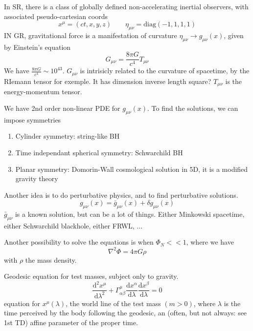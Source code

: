 \documentclass[a4paper]{book}
\theoremstyle{definition}
\theoremstyle{remark}
\begin{document}
In SR, there is a class of globally defined non-accelerating inertial observers, with associated pseudo-cartesian coords 
\begin{equation}
    x^\mu = (ct, x, y, z) \qquad \eta_{\mu\nu} = \text{diag}(-1, 1, 1, 1)
\end{equation}
IN GR, gravitational force is a manifestation of curvature $\eta_{\mu\nu} \rightarrow g_{\mu\nu}(x)$, given by Einstein's equation 
\begin{equation}
    G_{\mu\nu} = \frac{8\pi G}{c^4}T_{\mu\nu}
\end{equation}
We have $\frac{8\pi G}{c^4} \sim 10^{43}$. $G_{\mu\nu}$ is intrisicly related to the curvature of spacetime, by the RIemann tensor for exemple. It has dimension inverse length square? $T_{\mu\nu}$ is the energy-momentum tensor. \par \medskip 

We have 2nd order non-linear PDE for $g_{\mu\nu}(x)$. To find the solutions, we can impose symmetries 

\begin{enumerate}
    \item Cylinder symmetry: string-like BH
    \item Time independant spherical symmetry: Schwarchild BH 
    \item Planar symmetry: Domorin-Wall cosmological solution in 5D, it is a modified gravity theory
\end{enumerate}

Another idea is to do perturbative physics, and to find perturbative solutions. 
\begin{equation}
    g_{\mu\nu}(x) = \bar{g}_{\mu\nu}(x) + \delta g_{\mu\nu}(x)
\end{equation}
$\bar{g}_{\mu\nu}$ is a known solution, but can be a lot of things. Either Minkowski spacetime, either Schwarchild blackhole, either FRWL, ... \par \medskip 

Another possibility to solve the equations is when $\Phi_N << 1$, where we have 
\begin{equation}
    \nabla ^2 \Phi = 4\pi G\rho  
\end{equation}
with $\rho$ the mass density. \par \medskip 

Geodesic equation for test masses, subject only to gravity. 
\begin{equation}
    \frac{\text{d}^2x^\mu}{\text{d}\lambda^2} + \Gamma^\mu_{\alpha\beta} \frac{\text{d}x^\alpha}{\text{d}\lambda} \frac{\text{d} x^\beta}{\text{d}\lambda} = 0
\end{equation}
equation for $x^\mu(\lambda)$, the world line of the test mass $(m>0)$, where $\lambda$ is the time perceived by the body following the geodesic, an (often, but not always: see 1st TD) affine parameter of the proper time. \par \medskip 
\end{document}
